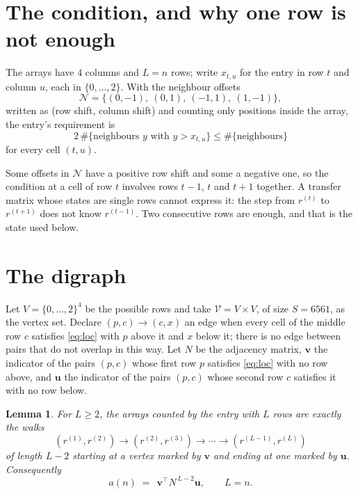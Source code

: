 \documentclass[11pt,a4paper]{article}
\theoremstyle{plain}
\newtheorem{lemma}[theorem]{Lemma}
\theoremstyle{definition}
\begin{document}
\section{The condition, and why one row is not enough}

The arrays have $4$ columns and $L=n$ rows; write $x_{t,u}$ for the entry in
row $t$ and column $u$, each in $\{0,\dots,2\}$. With the neighbour offsets
\[
\mathcal N=\{(0,-1),\ (0,1),\ (-1,1),\ (1,-1)\},
\]
written as (row shift, column shift) and counting only positions inside the array, the
entry's requirement is
\begin{equation}\label{eq:loc}
2\,\#\{\text{neighbours }y\text{ with }y>x_{t,u}\}\le\#\{\text{neighbours}\}
\end{equation}
for every cell $(t,u)$.

Some offsets in $\mathcal N$ have a positive row shift and some a negative one, so the
condition at a cell of row $t$ involves rows $t-1$, $t$ and $t+1$ together. A transfer
matrix whose states are single rows cannot express it: the step from $r^{(t)}$ to
$r^{(t+1)}$ does not know $r^{(t-1)}$. Two consecutive rows are enough, and that is
the state used below.

\section{The digraph}

Let $V=\{0,\dots,2\}^{4}$ be the possible rows and take
$\mathcal V=V\times V$, of size $S=6561$, as the vertex set. Declare $(p,c)\to(c,x)$ an edge
when every cell of the middle row $c$ satisfies \eqref{eq:loc} with $p$ above it and $x$
below it; there is no edge between pairs that do not overlap in this way. Let $N$ be the
adjacency matrix, $\mathbf{v}$ the indicator of the pairs $(p,c)$ whose first row $p$
satisfies \eqref{eq:loc} with no row above, and $\mathbf{u}$ the indicator of
the pairs $(p,c)$ whose second row $c$ satisfies it with no row below.

\begin{lemma}\label{lem:walk}
For $L\ge2$, the arrays counted by the entry with $L$ rows are exactly the walks
\[
(r^{(1)},r^{(2)})\to(r^{(2)},r^{(3)})\to\cdots\to(r^{(L-1)},r^{(L)})
\]
of length $L-2$ starting at a vertex marked by $\mathbf{v}$ and ending at one marked by
$\mathbf{u}$. Consequently
\[
a(n)\;=\;\,\mathbf{v}^{\!\top}N^{\,L-2}\mathbf{u},\qquad L=n .
\]
\end{lemma}
\end{document}
